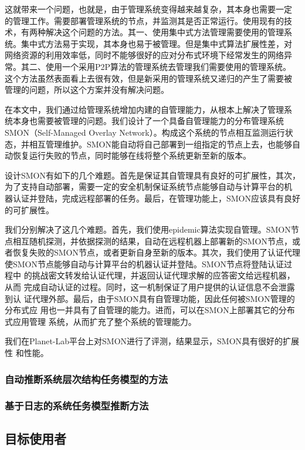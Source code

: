 这就带来一个问题，也就是，由于管理系统变得越来越复杂，其本身也需要一定
的管理工作。需要部署管理系统的节点，并监测其是否正常运行。使用现有的技
术，有两种解决这个问题的方法。其一、使用集中式方法管理需要使用的管理系
统。集中式方法易于实现，其本身也易于被管理。但是集中式算法扩展性差，对
网络资源的利用效率低，同时不能够很好的应对分布式环境下经常发生的网络异
常。其二、使用一个采用P2P算法的管理系统去管理我们需要使用的管理系统。
这个方法虽然表面看上去很有效，但是新采用的管理系统又递归的产生了需要被
管理的问题，所以这个方案并没有解决问题。

在本文中，我们通过给管理系统增加内建的自管理能力，从根本上解决了管理系
统本身也需要被管理的问题。我们设计了一个具备自管理能力的分布管理系统
SMON（Self-Managed Overlay Network）。构成这个系统的节点相互监测运行状
态，并相互管理维护。SMON能自动将自己部署到一组指定的节点上去，也能够自
动恢复运行失败的节点，同时能够在线将整个系统更新至新的版本。

设计SMON有如下的几个难题。首先是保证其自管理具有良好的可扩展性，其次，
为了支持自动部署，需要一定的安全机制保证系统节点能够自动与计算平台的机
器认证并登陆，完成远程部署的任务。最后，在管理功能上，SMON应该具有良好
的可扩展性。

我们分别解决了这几个难题。首先，我们使用epidemic算法实现自管理。SMON节
点相互随机探测，并依据探测的结果，自动在远程机器上部署新的SMON节点，或
者恢复失败的SMON节点，或者更新自身至新的版本。其次，我们使用了认证代理
使SMON节点能够自动与计算平台的机器认证并登陆。SMON节点将登陆认证过程中
的挑战密文转发给认证代理，并返回认证代理求解的应答密文给远程机器，从而
完成自动认证的过程。同时，这一机制保证了用户提供的认证信息不会泄露到认
证代理外部。最后，由于SMON具有自管理功能，因此任何被SMON管理的分布式应
用也一并具有了自管理的能力。进而，可以在SMON上部署其它的分布式应用管理
系统，从而扩充了整个系统的管理能力。

我们在Planet-Lab平台上对SMON进行了评测，结果显示，SMON具有很好的扩展性
和性能。

\subsubsection*{自动推断系统层次结构任务模型的方法}



\subsubsection*{基于日志的系统任务模型推断方法}

\subsection{目标使用者}

